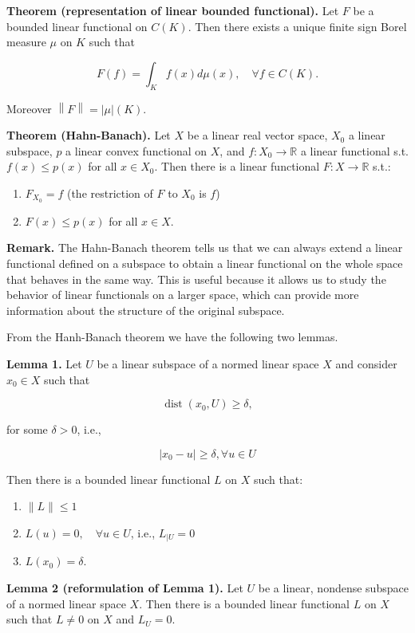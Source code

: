\textbf{Theorem (representation of linear bounded functional).} Let $F$ be a bounded linear functional on $C(K)$. Then there exists a unique finite sign Borel measure $\mu$ on $K$ such that

$$
F(f)=\int_Kf(x)d\mu(x), \quad \forall f\in C(K).
$$

Moreover $\left\|F\right\|=|\mu|(K)$.

\textbf{Theorem (Hahn-Banach).} Let $X$ be a linear real vector space, $X_0$ a linear subspace, $p$ a linear convex functional on $X$, and $f: X_0\rightarrow \mathbb{R}$ a linear functional s.t. $f(x)\leq p(x)$ for all $x\in X_0$. Then there is a linear functional $F:X\rightarrow \mathbb{R}$ s.t.:

\begin{enumerate}
  \item $F_{X_0}=f$ (the restriction of $F$ to $X_0$ is $f$)
  \item $F(x)\leq p(x)$ for all $x\in X$.
\end{enumerate}

\textbf{Remark.}  The Hahn-Banach theorem tells us that we can always extend a linear functional defined on a subspace to obtain a linear functional on the whole space that behaves in the same way. This is useful because it allows us to study the behavior of linear functionals on a larger space, which can provide more information about the structure of the original subspace.

From the Hanh-Banach theorem we have the following two lemmas.

\textbf{Lemma 1.} Let $U$ be a linear subspace of a normed linear space $X$ and consider $x_0 \in X$ such that

$$
\operatorname{dist}\left(x_0, U\right) \geq \delta,
$$

for some $\delta>0$, i.e.,

\[\left|x_0-u\right| \geq \delta, \forall u \in U\]

Then there is a bounded linear functional $L$ on $X$ such that:
\begin{enumerate}[i]
    \item $\|L\| \leq 1$
    \item $L(u)=0, \quad \forall u \in U$, i.e., $L_{\mid U}=0$
    \item $L\left(x_0\right)=\delta$.   
\end{enumerate}


\textbf{Lemma 2 (reformulation of Lemma 1).} Let $U$ be a linear, nondense subspace of a normed linear space $X$. Then there is a bounded linear functional $L$ on $X$ such that $L \neq 0$ on $X$ and $L_{U}=0$.

